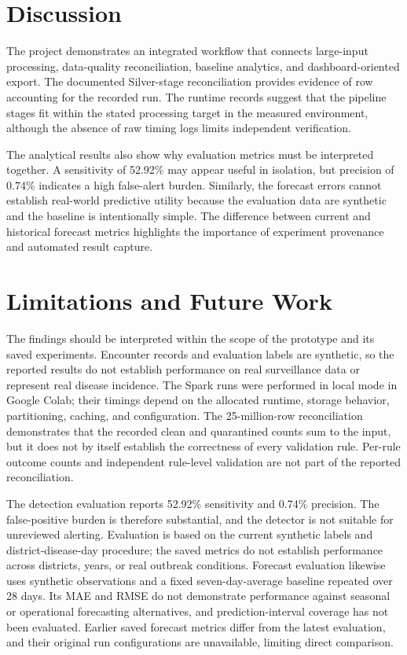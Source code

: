 \documentclass[conference]{IEEEtran}
\begin{document}
\FloatBarrier

\section{Discussion}

The project demonstrates an integrated workflow that connects large-input processing, data-quality reconciliation, baseline analytics, and dashboard-oriented export. The documented Silver-stage reconciliation provides evidence of row accounting for the recorded run. The runtime records suggest that the pipeline stages fit within the stated processing target in the measured environment, although the absence of raw timing logs limits independent verification.

The analytical results also show why evaluation metrics must be interpreted together. A sensitivity of 52.92\% may appear useful in isolation, but precision of 0.74\% indicates a high false-alert burden. Similarly, the forecast errors cannot establish real-world predictive utility because the evaluation data are synthetic and the baseline is intentionally simple. The difference between current and historical forecast metrics highlights the importance of experiment provenance and automated result capture.

\section{Limitations and Future Work}

The findings should be interpreted within the scope of the prototype and its saved experiments. Encounter records and evaluation labels are synthetic, so the reported results do not establish performance on real surveillance data or represent real disease incidence. The Spark runs were performed in local mode in Google Colab; their timings depend on the allocated runtime, storage behavior, partitioning, caching, and configuration. The 25-million-row reconciliation demonstrates that the recorded clean and quarantined counts sum to the input, but it does not by itself establish the correctness of every validation rule. Per-rule outcome counts and independent rule-level validation are not part of the reported reconciliation.

The detection evaluation reports 52.92\% sensitivity and 0.74\% precision. The false-positive burden is therefore substantial, and the detector is not suitable for unreviewed alerting. Evaluation is based on the current synthetic labels and district-disease-day procedure; the saved metrics do not establish performance across districts, years, or real outbreak conditions. Forecast evaluation likewise uses synthetic observations and a fixed seven-day-average baseline repeated over 28 days. Its MAE and RMSE do not demonstrate performance against seasonal or operational forecasting alternatives, and prediction-interval coverage has not been evaluated. Earlier saved forecast metrics differ from the latest evaluation, and their original run configurations are unavailable, limiting direct comparison.
\end{document}
